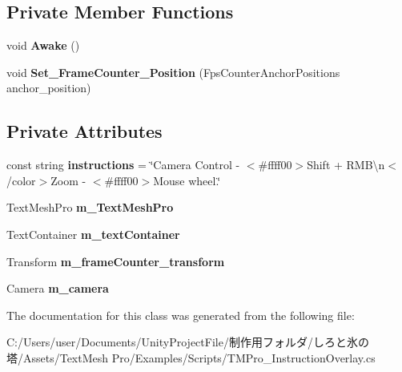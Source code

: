 \subsection*{Private Member Functions}
\begin{DoxyCompactItemize}
\item 
\mbox{\label{class_t_m_pro_1_1_examples_1_1_t_m_pro___instruction_overlay_afb58739e20ed8f89d916c4b3234df7bf}} 
void {\bfseries Awake} ()
\item 
\mbox{\label{class_t_m_pro_1_1_examples_1_1_t_m_pro___instruction_overlay_a5523290e9f3868aa26824851e50a895a}} 
void {\bfseries Set\+\_\+\+Frame\+Counter\+\_\+\+Position} (Fps\+Counter\+Anchor\+Positions anchor\+\_\+position)
\end{DoxyCompactItemize}
\subsection*{Private Attributes}
\begin{DoxyCompactItemize}
\item 
\mbox{\label{class_t_m_pro_1_1_examples_1_1_t_m_pro___instruction_overlay_ab92d76ac3e385ebe2707c2e67fb6f66f}} 
const string {\bfseries instructions} = \char`\"{}Camera Control -\/ $<$\#ffff00$>$Shift + R\+M\+B\textbackslash{}n$<$/color$>$Zoom -\/ $<$\#ffff00$>$Mouse wheel.\char`\"{}
\item 
\mbox{\label{class_t_m_pro_1_1_examples_1_1_t_m_pro___instruction_overlay_aba57a88e67df8155c4a8939d50e013c2}} 
Text\+Mesh\+Pro {\bfseries m\+\_\+\+Text\+Mesh\+Pro}
\item 
\mbox{\label{class_t_m_pro_1_1_examples_1_1_t_m_pro___instruction_overlay_a70ecdc78a8ff70646d33412fac6d5947}} 
Text\+Container {\bfseries m\+\_\+text\+Container}
\item 
\mbox{\label{class_t_m_pro_1_1_examples_1_1_t_m_pro___instruction_overlay_a92b1d17f2e6911e775485f7dde6cd16e}} 
Transform {\bfseries m\+\_\+frame\+Counter\+\_\+transform}
\item 
\mbox{\label{class_t_m_pro_1_1_examples_1_1_t_m_pro___instruction_overlay_a3488ab0ee8d1b9e35c9acd9f097cb077}} 
Camera {\bfseries m\+\_\+camera}
\end{DoxyCompactItemize}


The documentation for this class was generated from the following file\+:\begin{DoxyCompactItemize}
\item 
C\+:/\+Users/user/\+Documents/\+Unity\+Project\+File/制作用フォルダ/しろと氷の塔/\+Assets/\+Text\+Mesh Pro/\+Examples/\+Scripts/T\+M\+Pro\+\_\+\+Instruction\+Overlay.\+cs\end{DoxyCompactItemize}

